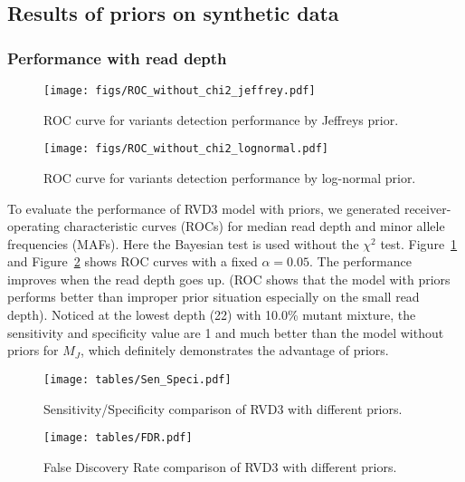\documentclass[11pt,reqno]{amsart}
\begin{document}
\subsection{Results of priors on synthetic data}
\subsubsection{Performance with read depth}

\begin{figure}[htbp]
\begin{center}
\texttt{[image: figs/ROC\_without\_chi2\_jeffrey.pdf]}
\caption{ROC curve for variants detection performance by Jeffreys prior.}
\label{fig:ROC_jeffrey}
\end{center}
\end{figure}


\begin{figure}[htbp]
\begin{center}
\texttt{[image: figs/ROC\_without\_chi2\_lognormal.pdf]}
\caption{ROC curve for variants detection performance by log-normal prior.}
\label{fig:ROC_lognormal}
\end{center}
\end{figure}

To evaluate the performance of RVD3 model with priors, we generated receiver-operating characteristic curves (ROCs) for median read depth and minor allele frequencies (MAFs). Here the Bayesian test is used without the $\chi^2$ test. Figure~\ref{fig:ROC_jeffrey} and Figure~\ref{fig:ROC_lognormal} shows ROC curves with a fixed $\alpha=0.05$. The performance improves when the read depth goes up. (ROC shows that the model with priors performs better than improper prior situation especially on the small read depth). Noticed at the lowest depth (22) with 10.0\% mutant mixture, the sensitivity and specificity value are 1 and much better than the model without priors for $M_J$, which definitely demonstrates the advantage of priors.

\begin{figure}[h]
\begin{center}
\texttt{[image: tables/Sen\_Speci.pdf]}
\caption{Sensitivity/Specificity comparison of RVD3 with different priors.}
\label{tbl:SS}
\end{center}
\end{figure}

\begin{figure}[h]
\begin{center}
\texttt{[image: tables/FDR.pdf]}
\caption{False Discovery Rate comparison of RVD3 with different priors.}
\label{tbl:FDR}
\end{center}
\end{figure}
\end{document}
